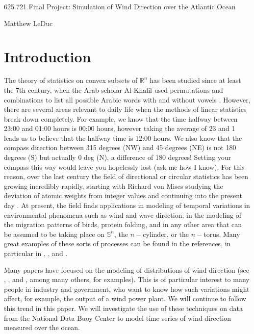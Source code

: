\documentclass[11pt]{article}
\numberwithin{equation}{section}
\numberwithin{figure}{section}
\begin{document}
\setlength\parindent{24pt}

\begin{center}


625.721 Final Project: Simulation of Wind Direction over the Atlantic Ocean

\null

Matthew LeDuc


\end{center}
\section{Introduction}

The theory of statistics on convex subsets of $\mathbb{R}^n$ has been studied since at least the 7th century, when the Arab scholar Al-Khalil used permutations and combinations to list all possible Arabic words with and without vowels \cite{Broemling}. However, there are several areas relevant to daily life when the methods of linear statistics break down completely. For example, we know that the time halfway between 23:00 and 01:00 hours is 00:00 hours, however taking the average of 23 and 1 leads us to believe that the halfway time is 12:00 hours. We also know that the compass direction between 315 degrees (NW) and 45 degrees (NE) is not 180 degrees (S) but actually 0 deg (N), a difference of 180 degrees! Setting your compass this way would leave you hopelessly lost (ask me how I know). For this reason, over the last century the field of directional or circular statistics has been growing incredibly rapidly, starting with Richard von Mises studying the deviation of atomic weights from integer values and continuing into the present day \cite{Mardia2}.  At present, the field finds applications in modeling of temporal variations in environmental phenomena such as wind and wave direction, in the modeling of the migration patterns of birds, protein folding, and in any other area that can be assumed to be taking place on $\mathbb{S}^n$, the $n-$cylinder, or the $n-$torus. Many great examples of these sorts of processes can be found in the references, in particular in \cite{Craig}, \cite{Kanti}, and \cite{Mardia2}. 

Many papers have focused on the modeling of distributions of wind direction (see \cite{Al Yammahi}, \cite{Craig}, and \cite{Mahrt}, among many others, for examples). This is of particular interest to many people in industry and government, who want to know how such variations might affect, for example, the output of a wind power plant. We will continue to follow this trend in this paper. We will investigate the use of these techniques on data from the National Data Buoy Center to model time series of wind direction measured over the ocean.
\end{document}

